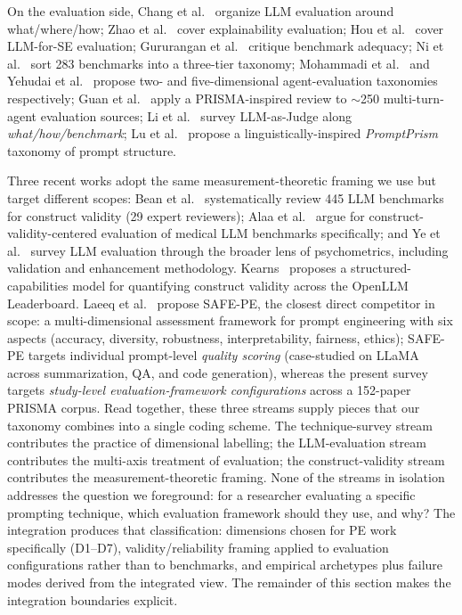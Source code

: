 \documentclass[acmsmall, nonacm, screen]{acmart}
\begin{document}
On the evaluation side, Chang et al.~\cite{chang2023survey}
organize LLM evaluation around what/where/how; Zhao et
al.~\cite{explainabilityllm2023} cover explainability evaluation;
Hou et al.~\cite{advancedllmsse2024} cover LLM-for-SE evaluation;
Gururangan et al.~\cite{inadequatebenchmarks2024} critique benchmark
adequacy; Ni et al.~\cite{ni2025benchmarks} sort 283 benchmarks into
a three-tier taxonomy; Mohammadi et al.~\cite{mohammadi2025agents}
and Yehudai et al.~\cite{yehudai2025agents} propose two- and
five-dimensional agent-evaluation taxonomies respectively; Guan et
al.~\cite{guan2025multiturn} apply a PRISMA-inspired review to
${\sim}$250 multi-turn-agent evaluation sources; Li et
al.~\cite{li2025generationjudgment} survey LLM-as-Judge along
\emph{what/how/benchmark}; Lu et al.~\cite{promptprism2025}
propose a linguistically-inspired \emph{PromptPrism} taxonomy of
prompt structure.

Three recent works adopt the same measurement-theoretic framing we use
but target different scopes:
Bean et al.~\cite{bean2025measuring} systematically review 445 LLM
benchmarks for construct validity (29 expert reviewers); Alaa et
al.~\cite{alaa2025medical} argue for construct-validity-centered
evaluation of medical LLM benchmarks specifically; and Ye et
al.~\cite{ye2025psychometrics} survey LLM evaluation through the
broader lens of psychometrics, including validation and enhancement
methodology. Kearns~\cite{kearns2026quantifying} proposes a
structured-capabilities model for quantifying construct validity
across the OpenLLM Leaderboard. Laeeq et al.~\cite{laeeq2026safepe}
propose SAFE-PE, the closest direct competitor in scope: a
multi-dimensional assessment framework for prompt engineering with
six aspects (accuracy, diversity, robustness, interpretability,
fairness, ethics); SAFE-PE targets individual prompt-level
\emph{quality scoring} (case-studied on LLaMA across summarization,
QA, and code generation), whereas the present survey targets
\emph{study-level evaluation-framework configurations} across a
152-paper PRISMA corpus. Read together, these three streams supply pieces that our taxonomy
combines into a single coding scheme. The technique-survey stream
contributes the practice of dimensional labelling; the LLM-evaluation
stream contributes the multi-axis treatment of evaluation; the
construct-validity stream contributes the measurement-theoretic
framing. None of the streams in isolation addresses the question we
foreground: for a researcher evaluating a specific prompting
technique, which evaluation framework should they use, and why?
The integration produces that classification: dimensions chosen for
PE work specifically (D1--D7), validity/reliability framing applied
to evaluation configurations rather than to benchmarks, and
empirical archetypes plus failure modes derived from the integrated
view. The remainder of this section makes the integration
boundaries explicit.
\end{document}
